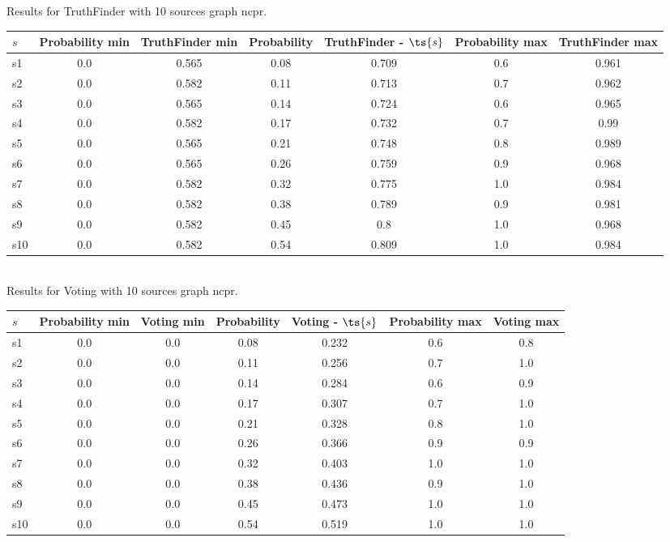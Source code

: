 \documentclass{article}
\begin{document}
\noindent Results for TruthFinder with 10 sources graph ncpr.

\noindent\begin{tabular}{|l|c|c|c|c|c|c|}
\hline
$s$& Probability min & TruthFinder min & Probability & TruthFinder - $\ts{s}$ & Probability max & TruthFinder max\\
\hline
s1 &0.0 & 0.565 & 0.08 & 0.709 & 0.6 & 0.961\\
\hline
s2 &0.0 & 0.582 & 0.11 & 0.713 & 0.7 & 0.962\\
\hline
s3 &0.0 & 0.565 & 0.14 & 0.724 & 0.6 & 0.965\\
\hline
s4 &0.0 & 0.582 & 0.17 & 0.732 & 0.7 & 0.99\\
\hline
s5 &0.0 & 0.565 & 0.21 & 0.748 & 0.8 & 0.989\\
\hline
s6 &0.0 & 0.565 & 0.26 & 0.759 & 0.9 & 0.968\\
\hline
s7 &0.0 & 0.582 & 0.32 & 0.775 & 1.0 & 0.984\\
\hline
s8 &0.0 & 0.582 & 0.38 & 0.789 & 0.9 & 0.981\\
\hline
s9 &0.0 & 0.582 & 0.45 & 0.8 & 1.0 & 0.968\\
\hline
s10 &0.0 & 0.582 & 0.54 & 0.809 & 1.0 & 0.984\\
\hline
\end{tabular}\\

\noindent Results for Voting with 10 sources graph ncpr.

\noindent\begin{tabular}{|l|c|c|c|c|c|c|}
\hline
$s$& Probability min & Voting min & Probability & Voting - $\ts{s}$ & Probability max & Voting max\\
\hline
s1 &0.0 & 0.0 & 0.08 & 0.232 & 0.6 & 0.8\\
\hline
s2 &0.0 & 0.0 & 0.11 & 0.256 & 0.7 & 1.0\\
\hline
s3 &0.0 & 0.0 & 0.14 & 0.284 & 0.6 & 0.9\\
\hline
s4 &0.0 & 0.0 & 0.17 & 0.307 & 0.7 & 1.0\\
\hline
s5 &0.0 & 0.0 & 0.21 & 0.328 & 0.8 & 1.0\\
\hline
s6 &0.0 & 0.0 & 0.26 & 0.366 & 0.9 & 0.9\\
\hline
s7 &0.0 & 0.0 & 0.32 & 0.403 & 1.0 & 1.0\\
\hline
s8 &0.0 & 0.0 & 0.38 & 0.436 & 0.9 & 1.0\\
\hline
s9 &0.0 & 0.0 & 0.45 & 0.473 & 1.0 & 1.0\\
\hline
s10 &0.0 & 0.0 & 0.54 & 0.519 & 1.0 & 1.0\\
\hline
\end{tabular}\\
\end{document}
